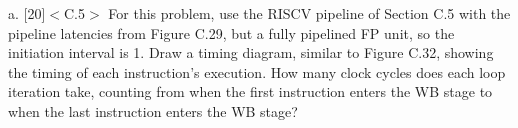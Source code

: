 \documentclass[11pt]{article}
\begin{document}
a. [20]$<$C.5$>$ For this problem, use the RISCV pipeline of Section C.5 with the pipeline latencies from Figure C.29, but a fully pipelined FP unit, so the initiation interval is 1. Draw a timing diagram, similar to Figure C.32, showing the timing of each instruction's execution. How many clock cycles does each loop iteration take, counting from when the first instruction enters the WB stage to when the last instruction enters the WB stage?

\begin{Answer}

\end{Answer}

\newpage
\end{document}
